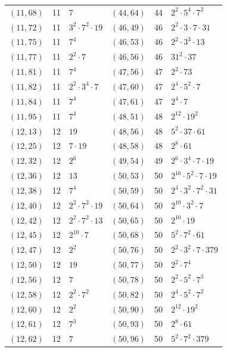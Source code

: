 \documentclass[11pt]{article}
\begin{document}
\begin{longtable}{@{}lrl@{\qquad}lrl@{}}
$(11,68)$ & 11 & $7$ & $(44,64)$ & 44 & $2^{2}\cdot 5^{4}\cdot 7^{2}$\\
$(11,72)$ & 11 & $3^{2}\cdot 7^{2}\cdot 19$ & $(46,49)$ & 46 & $2^{2}\cdot 3\cdot 7\cdot 31$\\
$(11,75)$ & 11 & $7^{4}$ & $(46,53)$ & 46 & $2^{2}\cdot 3^{3}\cdot 13$\\
$(11,77)$ & 11 & $2^{2}\cdot 7$ & $(46,56)$ & 46 & $31^{2}\cdot 37$\\
$(11,81)$ & 11 & $7^{4}$ & $(47,56)$ & 47 & $2^{2}\cdot 73$\\
$(11,82)$ & 11 & $2^{2}\cdot 3^{4}\cdot 7$ & $(47,60)$ & 47 & $2^{4}\cdot 5^{2}\cdot 7$\\
$(11,84)$ & 11 & $7^{4}$ & $(47,61)$ & 47 & $2^{4}\cdot 7$\\
$(11,95)$ & 11 & $7^{4}$ & $(48,51)$ & 48 & $2^{12}\cdot 19^{2}$\\
$(12,13)$ & 12 & $19$ & $(48,56)$ & 48 & $5^{2}\cdot 37\cdot 61$\\
$(12,25)$ & 12 & $7\cdot 19$ & $(48,58)$ & 48 & $2^{8}\cdot 61$\\
$(12,32)$ & 12 & $2^{6}$ & $(49,54)$ & 49 & $2^{6}\cdot 3^{4}\cdot 7\cdot 19$\\
$(12,36)$ & 12 & $13$ & $(50,53)$ & 50 & $2^{16}\cdot 5^{2}\cdot 7\cdot 19$\\
$(12,38)$ & 12 & $7^{4}$ & $(50,59)$ & 50 & $2^{4}\cdot 3^{2}\cdot 7^{2}\cdot 31$\\
$(12,40)$ & 12 & $2^{2}\cdot 7^{2}\cdot 19$ & $(50,64)$ & 50 & $2^{10}\cdot 3^{2}\cdot 7$\\
$(12,42)$ & 12 & $2^{2}\cdot 7^{2}\cdot 13$ & $(50,65)$ & 50 & $2^{10}\cdot 19$\\
$(12,45)$ & 12 & $2^{10}\cdot 7$ & $(50,68)$ & 50 & $5^{2}\cdot 7^{2}\cdot 61$\\
$(12,47)$ & 12 & $2^{2}$ & $(50,76)$ & 50 & $2^{2}\cdot 3^{2}\cdot 7\cdot 379$\\
$(12,50)$ & 12 & $19$ & $(50,77)$ & 50 & $2^{2}\cdot 7^{4}$\\
$(12,56)$ & 12 & $7$ & $(50,78)$ & 50 & $2^{2}\cdot 5^{2}\cdot 7^{3}$\\
$(12,58)$ & 12 & $2^{2}\cdot 7^{2}$ & $(50,82)$ & 50 & $2^{4}\cdot 5^{2}\cdot 7^{2}$\\
$(12,60)$ & 12 & $2^{2}$ & $(50,90)$ & 50 & $2^{12}\cdot 19^{2}$\\
$(12,61)$ & 12 & $7^{3}$ & $(50,93)$ & 50 & $2^{8}\cdot 61$\\
$(12,62)$ & 12 & $7$ & $(50,96)$ & 50 & $5^{2}\cdot 7^{2}\cdot 379$\\

\end{longtable}
\end{document}
